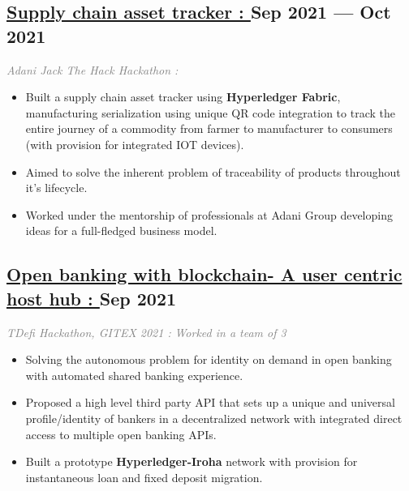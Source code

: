 \documentclass[a4,10pt]{article}
\def\gray#1{\textcolor{gray}{#1}}
\newenvironment{zitemize}{
\begin{itemize}\itemsep0pt \parskip0pt \parsep1pt}
{\end{itemize}\vspace{-0.5cm}}
\begin{document}
\subsection*{\href{https://github.com/Sigsev-Dev/AdaniWilmar-Asset-Tracker-using-Hyperledger-Fabric-with-QR-code-Integration}{Supply chain asset tracker : }  \hfill Sep 2021 --- Oct 2021}
\vspace{-0.05cm}
{\normalsize \normalfont \emph{\gray{Adani Jack The Hack Hackathon :}}}\hspace{0.1cm}{\normalsize \normalfont \emph{\gray{ Worked in a team of 3}}}
\vspace{-0.25cm}
    \begin{zitemize}
        \item Built a supply chain asset tracker using \textbf{Hyperledger Fabric}, manufacturing serialization using unique QR code integration to track the entire journey of a commodity from farmer to manufacturer to consumers (with provision for integrated IOT devices).
        \item Aimed to solve the inherent problem of traceability of products throughout it's lifecycle.
        \item Worked under the mentorship of professionals at Adani Group developing ideas for a full-fledged business model. 
    \end{zitemize}


\subsection*{\href{https://github.com/Sigsev-Dev/user_centric_host_hub_with_blockchain}{Open banking with blockchain- A user centric host hub : } \hfill Sep 2021 } 
\vspace{-0.05cm}
{\normalsize \normalfont \emph{\gray{TDefi Hackathon, GITEX 2021 :}}} {\normalsize \normalfont \emph{\gray{ Worked in a team of 3}}}
\vspace{-0.25cm}
    \begin{zitemize}
        \item Solving the autonomous problem for identity on demand in open banking with automated shared banking experience. 
        \item Proposed a high level third party API that sets up a unique and universal profile/identity of bankers in a decentralized network with integrated direct access to multiple open banking APIs.
        \item Built a prototype \textbf{Hyperledger-Iroha} network with provision for instantaneous loan and fixed deposit migration.
    \end{zitemize}
\end{document}

